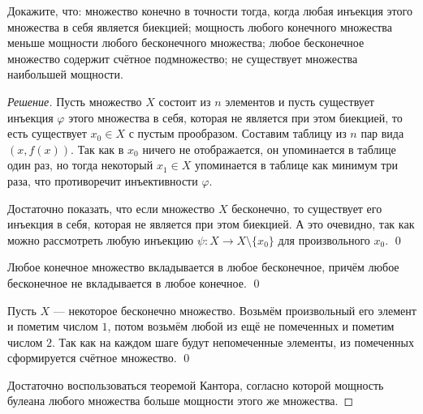     \begin{problem}[5]
        Докажите, что: множество конечно в точности тогда, когда любая инъекция этого множества в себя является биекцией; мощность любого конечного множества меньше мощности любого бесконечного множества; любое бесконечное множество содержит счётное подмножество; не существует множества наибольшей мощности.
    \end{problem}
    \begin{proof}[Решение]
        Пусть множество \(X\) состоит из \(n\) элементов и пусть существует инъекция \(\varphi\) этого множества в себя, которая не является при этом биекцией, то есть существует \(x_0 \in X\) с пустым прообразом. Составим таблицу из \(n\) пар вида \((x, f(x))\). Так как в \(x_0\) ничего не отображается, он упоминается в таблице один раз, но тогда некоторый \(x_1 \in X\) упоминается в таблице как минимум три раза, что противоречит инъективности \(\varphi\).

        Достаточно показать, что если множество \(X\) бесконечно, то существует его инъекция в себя, которая не является при этом биекцией. А это очевидно, так как можно рассмотреть любую инъекцию \(\psi \colon X \to X \setminus \{x_0\}\) для произвольного \(x_0\). \qed

        Любое конечное множество вкладывается в любое бесконечное, причём любое бесконечное не вкладывается в любое конечное. \qed

        Пусть \(X\) --- некоторое бесконечно множество. Возьмём произвольный его элемент и пометим числом \(1\), потом возьмём любой из ещё не помеченных и пометим числом \(2\). Так как на каждом шаге будут непомеченные элементы, из помеченных сформируется счётное множество. \qed

        Достаточно воспользоваться теоремой Кантора, согласно которой мощность булеана любого множества больше мощности этого же множества.
    \end{proof}

